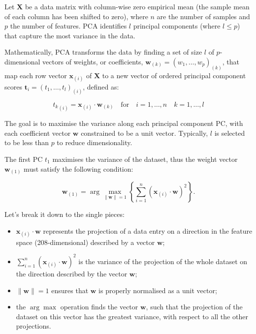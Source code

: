 Let $\mathbf{X}$ be a data matrix with column-wise zero empirical mean (the sample mean of each column has been shifted to zero), where $n$ are the number of samples and $p$ the number of features. PCA identifies $l$ principal components (where $l \leq p$) that capture the most variance in the data.

Mathematically, PCA transforms the data by finding a set of size $l$ of $p$-dimensional vectors of weights, or coefficients, $\mathbf{w}_{(k)} = (w_1, \ldots, w_p)_{(k)}$, that map each row vector $\mathbf{x}_{(i)}$ of $\mathbf{X}$ to a new vector of ordered principal component scores $\mathbf{t}_{i} = (t_1, \ldots, t_l)_{(i)}$, defined as:

\begin{equation}
{t_{k}}_{(i)} = \mathbf{x}_{(i)} \cdot \mathbf{w}_{(k)} \quad \text{for} \quad i = 1, \ldots, n \quad k = 1, \ldots, l
\end{equation}

The goal is to maximise the variance along each principal component PC, with each coefficient vector \(\mathbf{w}\) constrained to be a unit vector. Typically, \(l\) is selected to be less than \(p\) to reduce dimensionality.


The first PC $t_{1}$ maximises the variance of the dataset, thus the weight vector \(\mathbf{w}_{(1)}\) must satisfy the following condition:

\begin{equation}
\mathbf{w}_{(1)} = \arg \max_{\|\mathbf{w}\| = 1} \left\{ \sum_{i=1}^{n} \left( \mathbf{x}_{(i)} \cdot \mathbf{w} \right)^2 \right\}.\label{argmax}
\end{equation}

Let's break it down to the single pieces: 
\begin{itemize}
    \item $\mathbf{x}_{(i)} \cdot \mathbf{w}$ represents the projection of a data entry on a direction in the feature space (208-dimensional) described by a vector $ \mathbf{w}$;
    \item $ \sum_{i=1}^{n} \left( \mathbf{x}_{(i)} \cdot \mathbf{w} \right)^2$ is the variance of the projection of the whole dataset on the direction described by the vector $ \mathbf{w}$;
    \item $\|\mathbf{w}\| = 1$ ensures that $\mathbf{w}$ is properly normalised as a unit vector;
    \item the $\arg \max$ operation finds the vector $\mathbf{w}$, such that the projection of the dataset on this vector has the greatest variance, with respect to all the other projections.
\end{itemize}

